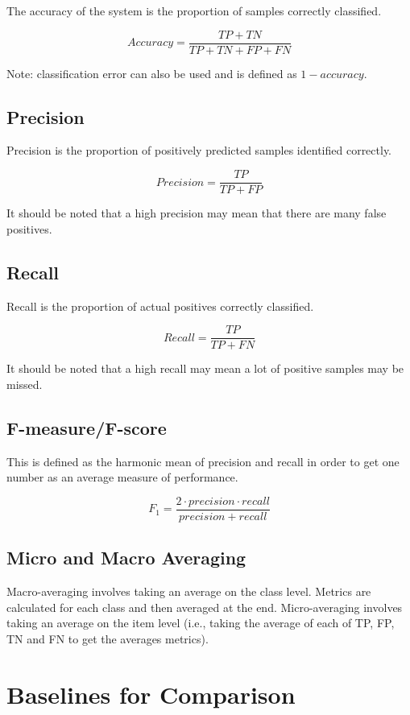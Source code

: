 The accuracy of the system is the proportion of samples correctly classified.

$$ Accuracy = \frac{TP + TN}{TP + TN + FP + FN} $$

Note: classification error can also be used and is defined as $ 1 - accuracy $.

\subsection{Precision}

Precision is the proportion of positively predicted samples identified correctly.

$$ Precision = \frac{TP}{TP + FP} $$

It should be noted that a high precision may mean that there are many false positives.

\subsection{Recall}

Recall is the proportion of actual positives correctly classified.

$$ Recall = \frac{TP}{TP + FN} $$

It should be noted that a high recall may mean a lot of positive samples may be missed.

\subsection{F-measure/F-score}

This is defined as the harmonic mean of precision and recall in order to get one number as an average measure of performance.

$$ F_1 = \frac{2 \cdot precision \cdot recall}{precision + recall} $$

\subsection{Micro and Macro Averaging} \label{ssec:eval_metric_averaging}

Macro-averaging involves taking an average on the class level. Metrics are calculated for each class and then averaged at the end. Micro-averaging involves taking an average on the item level (i.e., taking the average of each of TP, FP, TN and FN to get the averages metrics).

\section{Baselines for Comparison}

